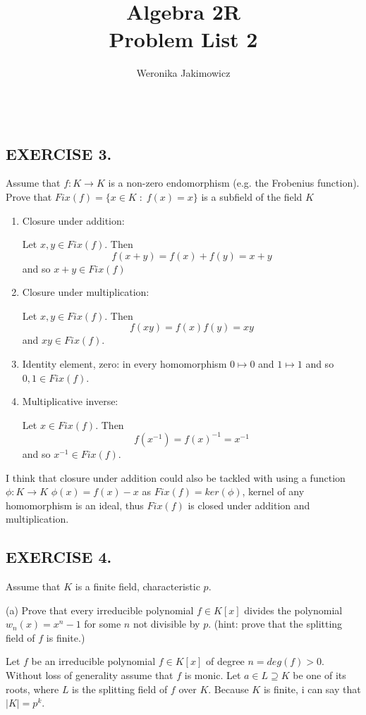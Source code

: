 \documentclass{article}
\title{\large Algebra 2R\smallskip\\ \textbf{Problem List 2}}
\author{\normalsize Weronika Jakimowicz}
\date{~~~}
\begin{document}
\maketitle\thispagestyle{empty}

\subsection*{EXERCISE 3.}
{\color{pink}Assume that $f:K\to K$ is a non-zero endomorphism (e.g. the Frobenius function). Prove that $Fix(f)=\{x\in K\;:\;f(x)=x\}$ is a subfield of the field $K$}
\smallskip

\begin{enumerate}
    \item Closure under addition:

    Let $x,y\in Fix(f)$. Then
    $$f(x+y)=f(x)+f(y)=x+y$$
    and so $x+y\in Fix(f)$

    \item Closure under multiplication:

    Let $x,y\in Fix(f)$. Then
    $$f(xy)=f(x)f(y)=xy$$
    and $xy\in Fix(f)$.

    \item Identity element, zero: in every homomorphism $0\mapsto 0$ and $1\mapsto 1$ and
    so $0,1\in Fix(f)$.

    \item Multiplicative inverse:
    
    Let $x\in Fix(f)$. Then
    $$f(x^{-1})=f(x)^{-1}=x^{-1}$$
    and so $x^{-1}\in Fix(f)$.
\end{enumerate}

I think that closure under addition could also be tackled with using a function $\phi:K\to
K$ $\phi(x)=f(x)-x$ as $Fix(f)=ker(\phi)$, kernel of any homomorphism is an ideal, thus
$Fix(f)$ is closed under addition and multiplication.

\subsection*{EXERCISE 4.}
{\color{pink}Assume that $K$ is a finite field, characteristic $p$.

(a) Prove that every irreducible polynomial $f\in K[x]$ divides the polynomial $w_n(x)=x^n-1$ for some $n$ not divisible by $p$. (hint: prove that the splitting field of $f$ is finite.)}

Let $f$ be an irreducible polynomial $f\in K[x]$ of degree $n=deg(f)>0$. Without loss of generality assume that $f$ is monic. Let $a\in L\supseteq K$ be one of its roots, where $L$ is the splitting field of $f$ over $K$. Because $K$ is finite, i can say that $|K|=p^k$.
\smallskip
\end{document}

